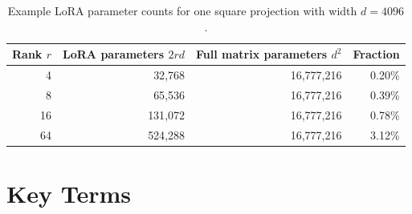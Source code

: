 \begin{table}[t]
\caption{Example LoRA parameter counts for one square projection with width $d=4096$.}
\label{tab:lora-rank-accounting}
\small
\centering
\begin{tabular}{@{}rrrr@{}}
\toprule
Rank $r$ & LoRA parameters $2rd$ & Full matrix parameters $d^2$ & Fraction \\
\midrule
4  & 32{,}768   & 16{,}777{,}216 & 0.20\% \\
8  & 65{,}536   & 16{,}777{,}216 & 0.39\% \\
16 & 131{,}072  & 16{,}777{,}216 & 0.78\% \\
64 & 524{,}288  & 16{,}777{,}216 & 3.12\% \\
\bottomrule
\end{tabular}
\end{table}

\section{Key Terms}
\label{sec:peft-key-terms}

